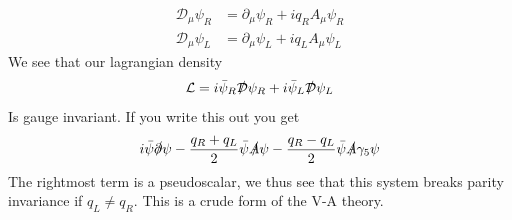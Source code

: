 \documentclass[11pt,a4paper,faculty=we,language=en,doctype=report]{cls/ugent-doc}
\begin{document}
\begin{align}
  \mathcal{D}_\mu\psi_R &= \partial_\mu\psi_R + iq_RA_\mu\psi_R\\
  \mathcal{D}_\mu\psi_L &= \partial_\mu\psi_L + iq_LA_\mu\psi_L
\end{align}
We see that our lagrangian density
\begin{equation}
  \mathcal{L} = i\bar{\psi}_R\slashed{\mathcal{D}}\psi_R + i\bar{\psi}_L\slashed{\mathcal{D}}\psi_L
\end{equation}
Is gauge invariant. If you write this out you get
\begin{equation}
  i\bar{\psi}\slashed{\partial}\psi - \frac{q_R + q_L}{2}\bar{\psi}\slashed{A}\psi - \frac{q_R - q_L}{2}\bar{\psi}\slashed{A}\gamma_5\psi
\end{equation}
The rightmost term is a pseudoscalar, we thus see that this system breaks
parity invariance if $ q_L \neq q_R$. This is a crude form of the V-A theory.
\end{document}
